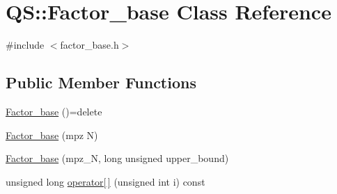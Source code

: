 \hypertarget{classQS_1_1Factor__base}{\section{Q\-S\-:\-:Factor\-\_\-base Class Reference}
\label{classQS_1_1Factor__base}
}


{\ttfamily \#include $<$factor\-\_\-base.\-h$>$}

\subsection*{Public Member Functions}
\begin{DoxyCompactItemize}
\item 
\hyperlink{classQS_1_1Factor__base_aca1749cec3b97820a8cd7c1571842171}{Factor\-\_\-base} ()=delete
\item 
\hyperlink{classQS_1_1Factor__base_abfb6516dac463ff1bcb809e248d6d190}{Factor\-\_\-base} (mpz N)
\item 
\hyperlink{classQS_1_1Factor__base_ad5143282621210f6726588483609b159}{Factor\-\_\-base} (mpz\-\_\-\-N, long unsigned upper\-\_\-bound)
\item 
unsigned long \hyperlink{classQS_1_1Factor__base_a0875850b751293b313ca7a28e96118f7}{operator\mbox{[}$\,$\mbox{]}} (unsigned int i) const 
\end{DoxyCompactItemize}


